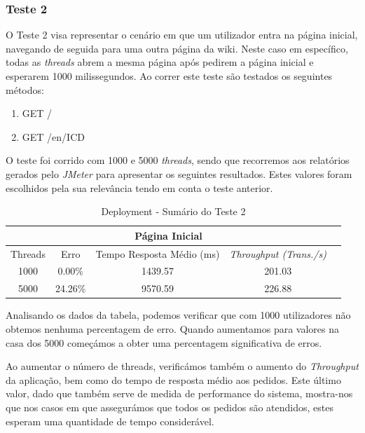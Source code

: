 
\subsubsection{Teste 2}

O Teste 2 visa representar o cenário em que um utilizador entra na página inicial, navegando de seguida para uma outra página da wiki. Neste caso em específico, todas as \textit{threads} abrem a mesma página após pedirem a página inicial e esperarem 1000 milissegundos. Ao correr este teste são testados os seguintes métodos:

\begin{enumerate}
  \item GET /
  \item GET /en/ICD
\end{enumerate}

O teste foi corrido com 1000 e 5000 \textit{threads}, sendo que recorremos aos relatórios gerados pelo \textit{JMeter} para apresentar os seguintes resultados. Estes valores foram escolhidos pela sua relevância tendo em conta o teste anterior.

\begin{table}[h!]
\centering
    \begin{tabular}{ |c|c|c|c|c|  }
        \hline
        \multicolumn{4}{|c|}{Página Inicial} \\
        \hline
         Threads & Erro & Tempo Resposta Médio (ms) & \textit{Throughput (Trans./s)}\\
        \hline
        1000  & 0.00\%   & 1439.57  & 201.03\\
        5000  & 24.26\%  & 9570.59 & 226.88\\
        \hline
    \end{tabular}
    \caption{Deployment - Sumário do Teste 2}
    \label{table:1}
\end{table}

Analisando os dados da tabela, podemos verificar que com 1000 utilizadores não obtemos nenhuma percentagem de erro. Quando aumentamos para valores na casa dos 5000 começámos a obter uma percentagem significativa de erros.

Ao aumentar o número de threads, verificámos também o aumento do \textit{Throughput} da aplicação, bem como do tempo de resposta médio aos pedidos. Este último valor, dado que também serve de medida de performance do sistema, mostra-nos que nos casos em que assegurámos que todos os pedidos são atendidos, estes esperam uma quantidade de tempo considerável. 

